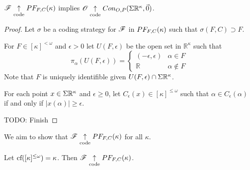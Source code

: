 \begin{thm}
  $\mathscr{F} \underset{\text{code}}{\uparrow} PF_{F,C}(\kappa)$ implies
  $\mathscr{O} \underset{\text{code}}{\uparrow} Con_{O,P}(\Sigma\mathbb{R}^{\kappa},\vec0)$.
\end{thm}

\begin{proof}
  Let $\sigma$ be a coding strategy for $\mathscr{F}$ in $PF_{F,C}(\kappa)$
  such that $\sigma(F,C)\supset F$.

  For $F\in[\kappa]^{<\omega}$ and $\epsilon>0$ let $U(F,\epsilon)$ be the
  open set in $\mathbb{R}^\kappa$ such that
  \[
    \pi_\alpha(U(F,\epsilon)) =
    \left\{
      \begin{array}{ll}
        (-\epsilon,\epsilon) & \alpha\in F\\
        \mathbb{R} & \alpha\not\in F
      \end{array}
    \right.
  \]
  Note that $F$ is uniquely identifible given
  $U(F,\epsilon)\cap\Sigma\mathbb{R}^{\kappa}$.

  For each point $x\in\Sigma\mathbb{R}^{\kappa}$ and $\epsilon\geq 0$, let
  $C_\epsilon(x)\in[\kappa]^{\leq\omega}$
  such that $\alpha\in C_\epsilon(\alpha)$ if and only if
  $|x(\alpha)|\geq\epsilon$.

  TODO: Finish



\end{proof}

We aim to show that $\mathscr{F} \underset{\text{code}}{\uparrow} PF_{F,C}(\kappa)$ for all
$\kappa$.

\begin{thm}
  Let $\textrm{cf}([\kappa]^{\leq\omega})=\kappa$.
  Then $\mathscr{F} \underset{\text{code}}{\uparrow} PF_{F,C}(\kappa)$.
\end{thm}

